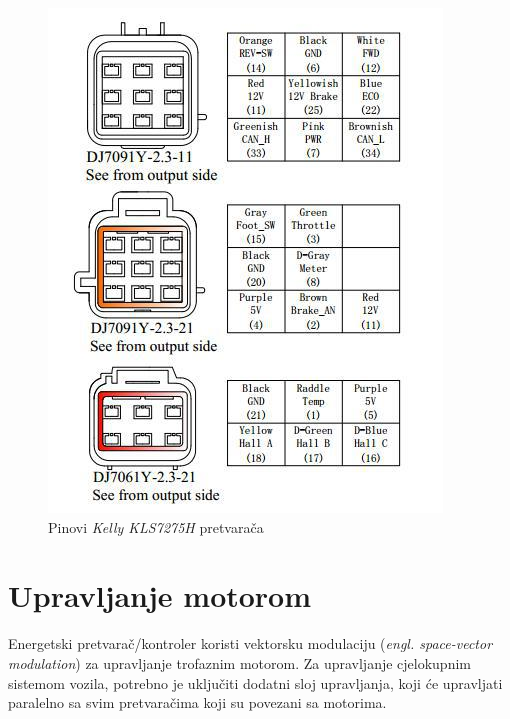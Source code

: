 \begin{figure}
\begin{center}
\includegraphics[scale=1]{slike/kellypins.jpg}
\end{center}
\caption{Pinovi \textit{Kelly KLS7275H} pretvarača}
\label{fig:kellypins}
\end{figure}

\section{Upravljanje motorom}

\qquad Energetski pretvarač/kontroler koristi vektorsku modulaciju (\textit{engl. space-vector modulation}) za upravljanje trofaznim motorom. Za upravljanje cjelokupnim sistemom vozila, potrebno je uključiti dodatni sloj upravljanja, koji će upravljati paralelno sa svim pretvaračima koji su povezani sa motorima.


